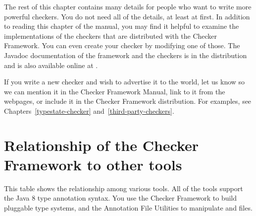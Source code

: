 The rest of this chapter contains many details for people who want to write more powerful
checkers.
You do not need all of the details, at least at first.
In addition to reading this chapter of the manual, you may find it helpful
to examine the implementations of the checkers that are distributed with
the Checker Framework.  You can even create your checker by modifying one
of those.
The Javadoc documentation of the framework and the checkers is in the
distribution and is also available online at
.

If you write a new checker and wish to advertise it to the world, let us
know so we can mention it in the Checker Framework Manual, link to
it from the webpages, or include it in the Checker Framework distribution.
For examples, see Chapters~\ref{typestate-checker}
and~\ref{third-party-checkers}.


\section{Relationship of the Checker Framework to other tools\label{tool-relationships}}

This table shows the relationship among various tools.
All of the tools support the Java 8 type annotation syntax.
You use the Checker Framework to build pluggable type systems, and the
Annotation File Utilities to manipulate  and  files.

\newlength{\bw}
\setlength{\bw}{.5in}


